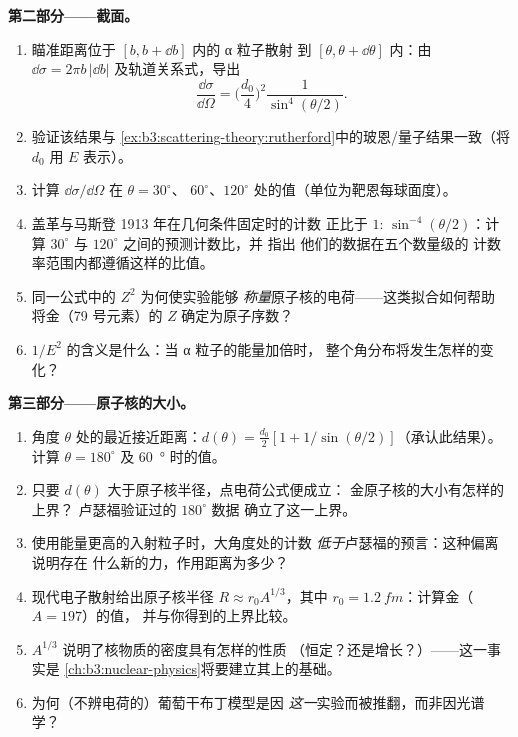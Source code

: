 \begin{problem}
\medskip\noindent\textbf{第二部分——截面。}
\begin{enumerate}[resume]
  \item 瞄准距离位于 $[b, b + \dd b]$ 内的 α 粒子散射
        到 $[\theta, \theta + \dd\theta]$ 内：由 $\dd\sigma =
        2\pi b\,|\dd b|$ 及轨道关系式，导出
        \[
        \frac{\dd\sigma}{\dd\Omega} =
        \Big(\frac{d_0}{4}\Big)^2\frac{1}{\sin^4(\theta/2)} .
        \]
  \item 验证该结果与
        \cref{ex:b3:scattering-theory:rutherford}中的玻恩/量子结果一致（将 $d_0$
        用 $E$ 表示）。
  \item 计算 $\dd\sigma/\dd\Omega$ 在 $\theta = 30^\circ$、
        $60^\circ$、$120^\circ$ 处的值（单位为靶恩每球面度）。
  \item 盖革与马斯登 1913 年在几何条件固定时的计数
        正比于 $1{:}\,\sin^{-4}(\theta/2)$：计算
        $30^\circ$ 与 $120^\circ$ 之间的预测计数比，并
        指出
        他们的数据在五个数量级的
        计数率范围内都遵循这样的比值。
  \item 同一公式中的 $Z^2$ 为何使实验能够
        \emph{称量}原子核的电荷——这类拟合如何帮助
        将金（79 号元素）的 $Z$ 确定为原子序数？
  \item $1/E^2$ 的含义是什么：当 α 粒子的能量加倍时，
        整个角分布将发生怎样的变化？
\end{enumerate}

\medskip\noindent\textbf{第三部分——原子核的大小。}
\begin{enumerate}[resume]
  \item 角度 $\theta$ 处的最近接近距离：$d(\theta) =
        \tfrac{d_0}2[1 + 1/\sin(\theta/2)]$（承认此结果）。计算
        $\theta = 180^\circ$ 及 \qty{60}{\degree} 时的值。
  \item 只要 $d(\theta)$ 大于原子核半径，点电荷公式便成立：
        金原子核的大小有怎样的上界？
        卢瑟福验证过的 $180^\circ$ 数据
        确立了这一上界。
  \item 使用能量更高的入射粒子时，大角度处的计数
        \emph{低于}卢瑟福的预言：这种偏离说明存在
        什么新的力，作用距离为多少？
  \item 现代电子散射给出原子核半径 $R
        \approx r_0A^{1/3}$，其中 $r_0 = \qty{1.2}{fm}$：计算金（$A = 197$）的值，
        并与你得到的上界比较。
  \item $A^{1/3}$ 说明了核物质的密度具有怎样的性质
        （恒定？还是增长？）——这一事实是
        \cref{ch:b3:nuclear-physics}将要建立其上的基础。
  \item 为何（不辨电荷的）葡萄干布丁模型是因
        \emph{这一}实验而被推翻，而非因光谱学？
\end{enumerate}


\end{problem}
